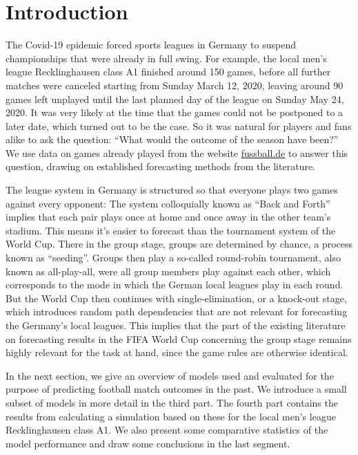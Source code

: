 \documentclass[12pt,a4paper]{article}
\begin{document}
\hypertarget{introduction}{%
\section{Introduction}\label{introduction}}

The Covid-19 epidemic forced sports leagues in Germany to suspend
championships that were already in full swing. For example, the local
men's league Recklinghausen class A1 finished around 150 games, before
all further matches were canceled starting from Sunday March 12, 2020,
leaving around 90 games left unplayed until the last planned day of the
league on Sunday May 24, 2020. It was very likely at the time that the
games could not be postponed to a later date, which turned out to be the
case. So it was natural for players and fans alike to ask the question:
\enquote{What would the outcome of the season have been?} We use data on
games already played from the website
\href{http://www.fussball.de/spieltagsuebersicht/re-kl-a-1-kreis-recklinghausen-kreisliga-a-herren-saison1920-westfalen/-/staffel/027II28DH8000009VS5489B3VS3GHJJU-G\#!/}{fussball.de}
to answer this question, drawing on established forecasting methods from
the literature.

The league system in Germany is structured so that everyone plays two
games against every opponent: The system colloquially known as
\enquote{Back and Forth} implies that each pair plays once at home and
once away in the other team's stadium. This means it's easier to
forecast than the tournament system of the World Cup. There in the group
stage, groups are determined by chance, a process known as
\enquote{seeding}. Groups then play a so-called round-robin tournament,
also known as all-play-all, were all group members play against each
other, which corresponds to the mode in which the German local leagues
play in each round. But the World Cup then continues with
single-elimination, or a knock-out stage, which introduces random path
dependencies that are not relevant for forecasting the Germany's local
leagues. This implies that the part of the existing literature on
forecasting results in the FIFA World Cup concerning the group stage
remains highly relevant for the task at hand, since the game rules are
otherwise identical.

In the next section, we give an overview of models used and evaluated
for the purpose of predicting football match outcomes in the past. We
introduce a small subset of models in more detail in the third part. The
fourth part contains the results from calculating a simulation based on
these for the local men's league Recklinghausen class A1. We also
present some comparative statistics of the model performance and draw
some conclusions in the last segment.
\end{document}
